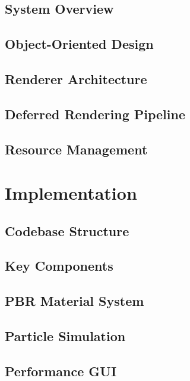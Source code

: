 \documentclass[12pt,a4paper,openright,twoside]{book}
\begin{document}
\section{System Overview}

\section{Object-Oriented Design}

\section{Renderer Architecture}

\section{Deferred Rendering Pipeline}

\section{Resource Management}

\chapter{Implementation}
\label{chap:implementation}

\section{Codebase Structure}

\section{Key Components}

\section{PBR Material System}

\section{Particle Simulation}

\section{Performance GUI}
\end{document}
